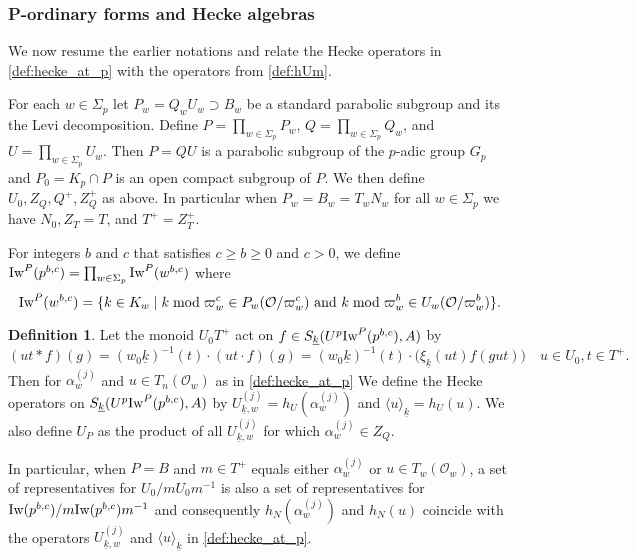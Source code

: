 \documentclass[leqno]{amsart}
\theoremstyle{definition}
\newtheorem{defn}[thm]{Definition}
\theoremstyle{remark}
\newcommand{\oo}{\mathcal{O}}
\newcommand{\wt}[1]{\underline{ #1 }}
\newcommand{\Iw}{\textnormal{Iw}} %
\begin{document}
\subsubsection{P-ordinary forms and Hecke algebras}

We now resume the earlier notations and
relate the Hecke operators in \eqref{def:hecke_at_p}
with the operators from \eqref{def:hUm}.

For each  $w\in \Sigma_p$ let $P_w=Q_wU_w\supset B_w$ 
be a standard parabolic subgroup
and its the Levi decomposition.
Define 
$P=\prod_{w\in \Sigma_p}P_w$, $Q=\prod_{w\in \Sigma_p}Q_w$, and
$U=\prod_{w\in \Sigma_p}U_w$.
Then $P=QU$ is a parabolic subgroup
of the $p$-adic group $G_p$ and $P_0=K_p\cap P$
is an open compact subgroup of $P$.
We then define $U_0, Z_Q, Q^+, Z_Q^+$ as above.
In particular when $P_w=B_w=T_wN_w$ for all $w\in\Sigma_p$
we have $N_0, Z_T=T$, and $T^+=Z_T^+$.

For integers $b$ and $c$ that satisfies $c\geq b\geq 0$ and $c>0$,
we define $\Iw^P(p^{b,c})=\prod_{w\in\Sigma_p}\Iw^P(w^{b,c})$ where
\begin{equation}\label{def:Iwahori_P}
	\Iw^P(w^{b,c})=\{
	k\in K_w\mid 
    k \bmod \varpi_w^c \in P_w(\oo/\varpi_w^c)
	\text{ and }
	k \bmod \varpi_w^b \in U_w(\oo/\varpi_w^b)
	\}.
\end{equation}


\begin{defn}\label{def:hecke}
Let the monoid $U_0T^+$ act on 
$f\in S_{\wt{k}}(U^p\Iw^P(p^{b,c}),A)$ by
\begin{equation}\label{def:T_act}
	(ut* f)(g)=(w_0\wt{k})^{-1}(t)\cdot (ut\cdot f)(g)=
    (w_0\wt{k})^{-1}(t)\cdot \big(\xi_{\wt{k}}(ut)f(gut)\big)\quad
    u\in U_0, t\in T^+.
\end{equation}
Then for $\alpha_w^{(j)}$ and $u\in T_n(\oo_w)$ 
as in \eqref{def:hecke_at_p}
We define the Hecke operators on
$S_{\wt{k}}(U^p\Iw^P(p^{b,c}),A)$ by
$U_{\wt{k},w}^{(j)}=h_U(\alpha_w^{(j)})$
and $\langle u\rangle_{\wt{k}}=h_U(u)$.
We also define $U_P$
as the product of all $U_{\wt{k},w}^{(j)}$
for which $\alpha_w^{(j)}\in Z_Q$.

In particular, when $P=B$
and $m\in T^+$ equals either $\alpha_{w}^{(j)}$ or $u\in T_w(\oo_w)$,
a set of representatives for $U_0/mU_0m^{-1}$
is also a set of representatives for 
$\Iw(p^{b,c})/m\Iw(p^{b,c})m^{-1}$
and consequently 
$h_N(\alpha_w^{(j)})$ and $h_N(u)$
coincide with the operators $U_{\wt{k},w}^{(j)}$ and 
$\langle u\rangle_{\wt{k}}$ in \eqref{def:hecke_at_p}.
\end{defn}
\end{document}
